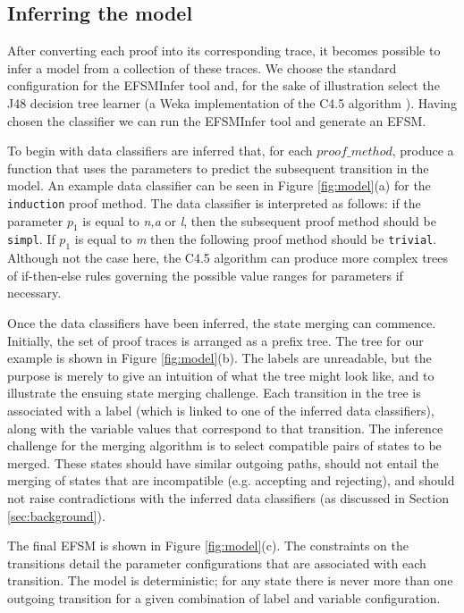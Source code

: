 \documentclass{llncs}
\begin{document}
\subsection{Inferring the model}
After converting each proof into its corresponding trace, it becomes possible to infer a model from a collection of these traces. We choose the standard configuration for the EFSMInfer tool and, for the sake of illustration select the J48 decision tree learner (a Weka implementation of the C4.5 algorithm \cite{Quinlan93}). Having chosen the classifier we can run the EFSMInfer tool and generate an EFSM.

To begin with data classifiers are inferred that, for each $proof\_method$, produce a function that uses the parameters to predict the subsequent transition in the model. An example data classifier can be seen in Figure \ref{fig:model}(a) for the {\tt induction} proof method. The data classifier is interpreted as follows: if the parameter $p_1$ is equal to \emph{n,a} or \emph{l}, then the subsequent proof method should be {\tt simpl}. If $p_1$ is equal to \emph{m} then the following proof method should be {\tt trivial}. Although not the case here, the C4.5 algorithm can produce more complex trees of if-then-else rules governing the possible value ranges for parameters if necessary.

Once the data classifiers have been inferred, the state merging can commence. Initially, the set of proof traces is arranged as a prefix tree. The tree for our example is shown in Figure \ref{fig:model}(b). The labels are unreadable, but the purpose is merely to give an intuition of what the tree might look like, and to illustrate the ensuing state merging challenge. Each transition in the tree is associated with a label (which is linked to one of the inferred data classifiers), along with the variable values that correspond to that transition. The inference challenge for the merging algorithm is to select compatible pairs of states to be merged. These states should have similar outgoing paths, should not entail the merging of states that are incompatible (e.g. accepting and rejecting), and should not raise contradictions with the inferred data classifiers (as discussed in Section \ref{sec:background}).

The final EFSM is shown in Figure \ref{fig:model}(c). The constraints on the transitions detail the parameter configurations that are associated with each transition. The model is deterministic; for any state there is never more than one outgoing transition for a given combination of label and variable configuration.
\end{document}
